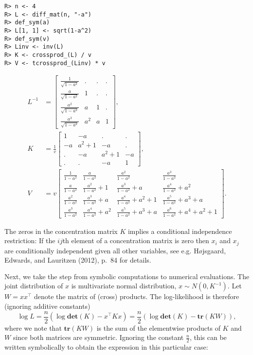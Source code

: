\begin{verbatim}
R> n <- 4
R> L <- diff_mat(n, "-a")
R> def_sym(a)
R> L[1, 1] <- sqrt(1-a^2)
R> def_sym(v)
R> Linv <- inv(L)
R> K <- crossprod_(L) / v
R> V <- tcrossprod_(Linv) * v
\end{verbatim}

\begin{align} 
    L^{-1} &= \left[\begin{matrix}\frac{1}{\sqrt{1 - a^{2}}} & . & . & .\\\frac{a}{\sqrt{1 - a^{2}}} & 1 & . & .\\\frac{a^{2}}{\sqrt{1 - a^{2}}} & a & 1 & .\\\frac{a^{3}}{\sqrt{1 - a^{2}}} & a^{2} & a & 1\end{matrix}\right] , \\ 
    K &= \frac{1}{v}  \left[\begin{matrix}1 & - a & . & .\\- a & a^{2} + 1 & - a & .\\. & - a & a^{2} + 1 & - a\\. & . & - a & 1\end{matrix}\right] , \\ 
    V &= v  \left[\begin{matrix}\frac{1}{1 - a^{2}} & \frac{a}{1 - a^{2}} & \frac{a^{2}}{1 - a^{2}} & \frac{a^{3}}{1 - a^{2}}\\\frac{a}{1 - a^{2}} & \frac{a^{2}}{1 - a^{2}} + 1 & \frac{a^{3}}{1 - a^{2}} + a & \frac{a^{4}}{1 - a^{2}} + a^{2}\\\frac{a^{2}}{1 - a^{2}} & \frac{a^{3}}{1 - a^{2}} + a & \frac{a^{4}}{1 - a^{2}} + a^{2} + 1 & \frac{a^{5}}{1 - a^{2}} + a^{3} + a\\\frac{a^{3}}{1 - a^{2}} & \frac{a^{4}}{1 - a^{2}} + a^{2} & \frac{a^{5}}{1 - a^{2}} + a^{3} + a & \frac{a^{6}}{1 - a^{2}} + a^{4} + a^{2} + 1\end{matrix}\right]  .
  \end{align}

The zeros in the concentration matrix \(K\) implies a conditional
independence restriction: If the \(ij\)th element of a concentration
matrix is zero then \(x_i\) and \(x_j\) are conditionally independent
given all other variables, see e.g. Højsgaard, Edwards, and Lauritzen (2012), p.~84 for
details.

Next, we take the step from symbolic computations to numerical
evaluations. The joint distribution of \(x\) is multivariate normal
distribution, \(x\sim N(0, K^{-1})\). Let \(W=x x^\top\) denote the
matrix of (cross) products. The log-likelihood is therefore (ignoring
additive constants)
\[ 
\log L = \frac n 2 (\log \mathbf{det}(K) - x^\top K x) = \frac n 2 (\log \mathbf{det}(K) - \mathbf{tr}(K W)), 
\]
where we note that \(\mathbf{tr}(KW)\) is the
sum of the elementwise products of \(K\) and \(W\) since both matrices are
symmetric. Ignoring the constant \(\frac n 2\),
this can be written symbolically to obtain the expression in
this particular case:

